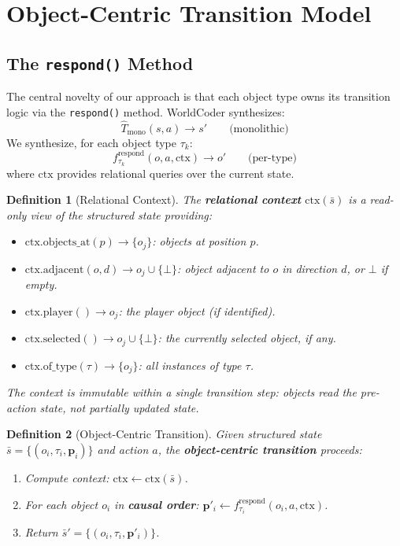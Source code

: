 \documentclass{article}
\newtheorem{definition}{Definition}
\begin{document}
\section{Object-Centric Transition Model}
\label{sec:oop_transition}

\subsection{The \texttt{respond()} Method}
\label{sec:respond}

The central novelty of our approach is that each object type owns its
transition logic via the \texttt{respond()} method.  WorldCoder synthesizes:
\begin{equation}
    \hat{T}_{\text{mono}}(s, a) \to s' \qquad \text{(monolithic)}
\end{equation}
We synthesize, for each object type $\tau_k$:
\begin{equation}
    f_{\tau_k}^{\text{respond}}(o, a, \text{ctx}) \to o' \qquad
    \text{(per-type)}
\end{equation}
where $\text{ctx}$ provides relational queries over the current state.

\begin{definition}[Relational Context]
\label{def:context}
The \textbf{relational context} $\text{ctx}(\bar{s})$ is a read-only view of
the structured state providing:
\begin{itemize}[nosep]
    \item $\text{ctx}.\text{objects\_at}(p) \to \{o_j\}$: objects at position $p$.
    \item $\text{ctx}.\text{adjacent}(o, d) \to o_j \cup \{\bot\}$: object
          adjacent to $o$ in direction $d$, or $\bot$ if empty.
    \item $\text{ctx}.\text{player}() \to o_j$: the player object (if identified).
    \item $\text{ctx}.\text{selected}() \to o_j \cup \{\bot\}$: the currently
          selected object, if any.
    \item $\text{ctx}.\text{of\_type}(\tau) \to \{o_j\}$: all instances of type $\tau$.
\end{itemize}
The context is immutable within a single transition step: objects read the
pre-action state, not partially updated state.
\end{definition}

\begin{definition}[Object-Centric Transition]
\label{def:oop_transition}
Given structured state $\bar{s} = \{(o_i, \tau_i, \mathbf{p}_i)\}$ and
action $a$, the \textbf{object-centric transition} proceeds:
\begin{enumerate}[nosep]
    \item Compute context: $\text{ctx} \leftarrow \text{ctx}(\bar{s})$.
    \item For each object $o_i$ in \textbf{causal order}:
          $\mathbf{p}'_i \leftarrow f_{\tau_i}^{\text{respond}}(o_i, a, \text{ctx})$.
    \item Return $\bar{s}' = \{(o_i, \tau_i, \mathbf{p}'_i)\}$.
\end{enumerate}
\end{definition}
\end{document}
